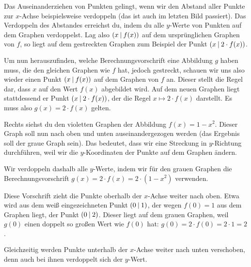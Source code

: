 \documentclass[../../main.tex]{subfiles}
\begin{document}
Das Auseinanderziehen von Punkten gelingt, wenn wir den Abstand aller Punkte zur $x$-Achse beispielsweise verdoppeln (das ist auch im letzten Bild passiert). Das Verdoppeln des Abstandes erreichst du, indem du alle $y$-Werte von Punkten auf dem Graphen verdoppelst. Lag also $\left(x \:\middle|\: f(x)\right)$ auf dem ursprünglichen Graphen von $f$, so liegt auf dem gestreckten Graphen zum Beispiel der Punkt $\left(x \:\middle|\: 2\cdot f(x)\right)$.

Um nun herauszufinden, welche Berechnungsvorschrift eine Abbildung $g$ haben muss, die den gleichen Graphen wie $f$ hat, jedoch gestreckt, schauen wir uns also wieder einen Punkt $\left(x \:\middle|\: f(x)\right)$ auf dem Graphen von $f$ an. Dieser stellt die Regel dar, dass $x$ auf den Wert $f(x)$ abgebildet wird. Auf dem neuen Graphen liegt stattdessend er Punkt $\left(x \:\middle|\: 2\cdot f(x)\right)$, der die Regel $x\mapsto 2\cdot f(x)$ darstellt. Es muss also $g(x)=2\cdot f(x)$ gelten.

\begin{example}{}
    Rechts siehst du den violetten Graphen der Abbildung $f(x)=1-x^2$. Dieser Graph soll nun nach oben und unten auseinandergezogen werden (das Ergebnis soll der graue Graph sein). Das bedeutet, dass wir eine Streckung in $y$-Richtung durchführen, weil wir die $y$-Koordinaten der Punkte auf dem Graphen ändern.
    
    Wir verdoppeln dashalb alle $y$-Werte, indem wir für den grauen Graphen die Berechnungsvorschrift $g(x)=2\cdot f(x)=2\cdot(1-x^2)$ verwenden.
    
    Diese Vorschrift zieht die Punkte oberhalb der $x$-Achse weiter nach oben. Etwa wird aus dem weiß eingezeichneten Punkt $\left(0 \:\middle|\: 1\right)$, der wegen $f(0)=1$ aus dem Graphen liegt, der Punkt $\left(0 \:\middle|\: 2\right)$. Dieser liegt auf dem grauen Graphen, weil $g(0)$ einen doppelt so großen Wert wie $f(0)$ hat: $g(0)=2\cdot f(0)=2\cdot 1=2$.
    
    Gleichzeitig werden Punkte unterhalb der $x$-Achse weiter nach unten verschoben, denn auch bei ihnen verdoppelt sich der $y$-Wert.
\end{example}
\end{document}
